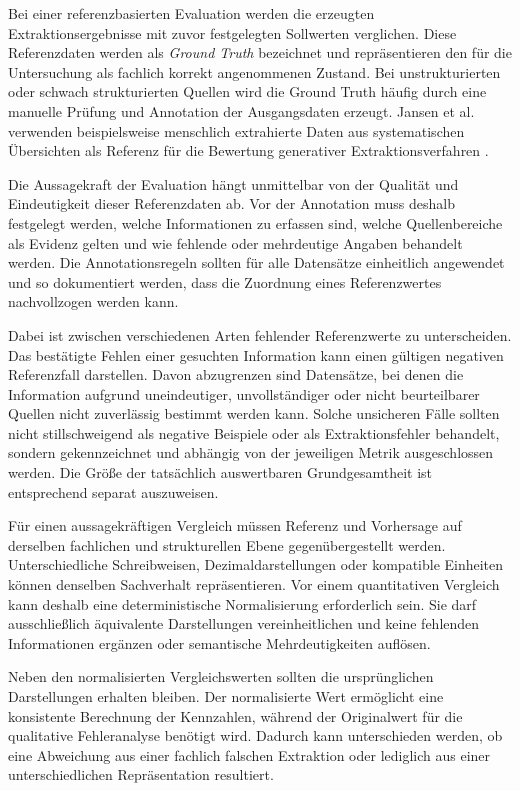 Bei einer referenzbasierten Evaluation werden die erzeugten Extraktionsergebnisse mit zuvor festgelegten Sollwerten verglichen. Diese Referenzdaten werden als \emph{Ground Truth} 
bezeichnet und repräsentieren den für die Untersuchung als fachlich korrekt angenommenen Zustand. Bei unstrukturierten oder schwach strukturierten Quellen wird die Ground Truth 
häufig durch eine manuelle Prüfung und Annotation der Ausgangsdaten erzeugt. Jansen et al. verwenden beispielsweise menschlich extrahierte Daten aus systematischen Übersichten 
als Referenz für die Bewertung generativer Extraktionsverfahren \cite{data_extraction_ai}.

Die Aussagekraft der Evaluation hängt unmittelbar von der Qualität und Eindeutigkeit dieser Referenzdaten ab. Vor der Annotation muss deshalb festgelegt werden, welche 
Informationen zu erfassen sind, welche Quellenbereiche als Evidenz gelten und wie fehlende oder mehrdeutige Angaben behandelt werden. Die Annotationsregeln sollten für 
alle Datensätze einheitlich angewendet und so dokumentiert werden, dass die Zuordnung eines Referenzwertes nachvollzogen werden kann.

Dabei ist zwischen verschiedenen Arten fehlender Referenzwerte zu unterscheiden. Das bestätigte Fehlen einer gesuchten Information kann einen gültigen negativen Referenzfall 
darstellen. Davon abzugrenzen sind Datensätze, bei denen die Information aufgrund uneindeutiger, unvollständiger oder nicht beurteilbarer Quellen nicht zuverlässig bestimmt 
werden kann. Solche unsicheren Fälle sollten nicht stillschweigend als negative Beispiele oder als Extraktionsfehler behandelt, sondern gekennzeichnet und abhängig von der 
jeweiligen Metrik ausgeschlossen werden. Die Größe der tatsächlich auswertbaren Grundgesamtheit ist entsprechend separat auszuweisen.

Für einen aussagekräftigen Vergleich müssen Referenz und Vorhersage auf derselben fachlichen und strukturellen Ebene gegenübergestellt werden. Unterschiedliche Schreibweisen, 
Dezimaldarstellungen oder kompatible Einheiten können denselben Sachverhalt repräsentieren. Vor einem quantitativen Vergleich kann deshalb eine deterministische 
Normalisierung erforderlich sein. Sie darf ausschließlich äquivalente Darstellungen vereinheitlichen und keine fehlenden Informationen ergänzen oder semantische 
Mehrdeutigkeiten auflösen.

Neben den normalisierten Vergleichswerten sollten die ursprünglichen Darstellungen erhalten bleiben. Der normalisierte Wert ermöglicht eine konsistente Berechnung der 
Kennzahlen, während der Originalwert für die qualitative Fehleranalyse benötigt wird. Dadurch kann unterschieden werden, ob eine Abweichung aus einer fachlich falschen 
Extraktion oder lediglich aus einer unterschiedlichen Repräsentation resultiert.

